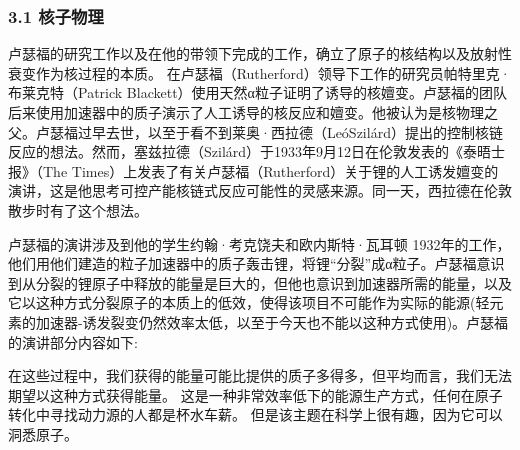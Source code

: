 \subsubsection{3.1 核子物理}
卢瑟福的研究工作以及在他的带领下完成的工作，确立了原子的核结构以及放射性衰变作为核过程的本质。 在卢瑟福（Rutherford）领导下工作的研究员帕特里克·布莱克特（Patrick Blackett）使用天然α粒子证明了诱导的核嬗变。卢瑟福的团队后来使用加速器中的质子演示了人工诱导的核反应和嬗变。他被认为是核物理之父。卢瑟福过早去世，以至于看不到莱奥·西拉德（LeóSzilárd）提出的控制核链反应的想法。然而，塞兹拉德（Szilárd）于1933年9月12日在伦敦发表的《泰晤士报》（The Times）上发表了有关卢瑟福（Rutherford）关于锂的人工诱发嬗变的演讲，这是他思考可控产能核链式反应可能性的灵感来源。同一天，西拉德在伦敦散步时有了这个想法。

卢瑟福的演讲涉及到他的学生约翰·考克饶夫和欧内斯特·瓦耳顿 1932年的工作，他们用他们建造的粒子加速器中的质子轰击锂，将锂“分裂”成α粒子。卢瑟福意识到从分裂的锂原子中释放的能量是巨大的，但他也意识到加速器所需的能量，以及它以这种方式分裂原子的本质上的低效，使得该项目不可能作为实际的能源(轻元素的加速器-诱发裂变仍然效率太低，以至于今天也不能以这种方式使用)。卢瑟福的演讲部分内容如下:

在这些过程中，我们获得的能量可能比提供的质子多得多，但平均而言，我们无法期望以这种方式获得能量。 这是一种非常效率低下的能源生产方式，任何在原子转化中寻找动力源的人都是杯水车薪。 但是该主题在科学上很有趣，因为它可以洞悉原子。

